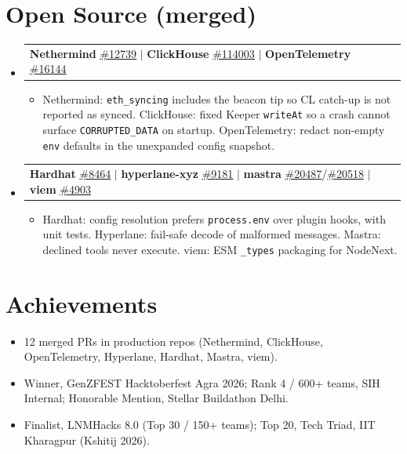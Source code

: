 \documentclass[letterpaper,11pt]{article}
\makeatletter
\newcommand{\resumeItem}[1]{
  \item\small{
    {#1 \vspace{-5pt}}
  }
}
\newcommand{\resumeProjectHeading}[2]{
  \item
    \begin{tabular*}{0.97\textwidth}{l@{\extracolsep{\fill}}r}
      \small#1 & #2 \\
    \end{tabular*}\vspace{-9pt}
}
\newcommand{\resumeSubHeadingListStart}{\begin{itemize}[leftmargin=0.15in, label={}]}
\newcommand{\resumeSubHeadingListEnd}{\end{itemize}}
\newcommand{\resumeItemListStart}{\begin{itemize}}
\newcommand{\resumeItemListEnd}{\end{itemize}\vspace{-10pt}}
\makeatother
\begin{document}
\section{Open Source (merged)}
  \resumeSubHeadingListStart
    \resumeProjectHeading
      {\textbf{Nethermind} \href{https://github.com/NethermindEth/nethermind/pull/12739}{\underline{\#12739}} $|$ \textbf{ClickHouse} \href{https://github.com/ClickHouse/ClickHouse/pull/114003}{\underline{\#114003}} $|$ \textbf{OpenTelemetry} \href{https://github.com/open-telemetry/opentelemetry-collector/pull/16144}{\underline{\#16144}}}{}
      \resumeItemListStart
        \resumeItem{Nethermind: \texttt{eth\_syncing} includes the beacon tip so CL catch-up is not reported as synced. ClickHouse: fixed Keeper \texttt{writeAt} so a crash cannot surface \texttt{CORRUPTED\_DATA} on startup. OpenTelemetry: redact non-empty \texttt{env} defaults in the unexpanded config snapshot.}
      \resumeItemListEnd
    \resumeProjectHeading
      {\textbf{Hardhat} \href{https://github.com/NomicFoundation/hardhat/pull/8464}{\underline{\#8464}} $|$ \textbf{hyperlane-xyz} \href{https://github.com/hyperlane-xyz/hyperlane-monorepo/pull/9181}{\underline{\#9181}} $|$ \textbf{mastra} \href{https://github.com/mastra-ai/mastra/pull/20487}{\underline{\#20487}}/\href{https://github.com/mastra-ai/mastra/pull/20518}{\underline{\#20518}} $|$ \textbf{viem} \href{https://github.com/wevm/viem/pull/4903}{\underline{\#4903}}}{}
      \resumeItemListStart
        \resumeItem{Hardhat: config resolution prefers \texttt{process.env} over plugin hooks, with unit tests. Hyperlane: fail-safe decode of malformed messages. Mastra: declined tools never execute. viem: ESM \texttt{\_types} packaging for NodeNext.}
      \resumeItemListEnd
  \resumeSubHeadingListEnd

\section{Achievements}
  \begin{itemize}[leftmargin=0.15in]
    \resumeItem{12 merged PRs in production repos (Nethermind, ClickHouse, OpenTelemetry, Hyperlane, Hardhat, Mastra, viem).}
    \resumeItem{Winner, GenZFEST Hacktoberfest Agra 2026; Rank 4 / 600+ teams, SIH Internal; Honorable Mention, Stellar Buildathon Delhi.}
    \resumeItem{Finalist, LNMHacks 8.0 (Top 30 / 150+ teams); Top 20, Tech Triad, IIT Kharagpur (Kshitij 2026).}
  \end{itemize}
\end{document}
